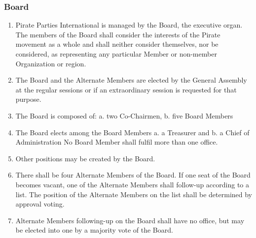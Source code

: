 \begin{frame}

\frametitle{Board}
\label{board}

\begin{enumerate}
\item Pirate Parties International is managed by the Board, the executive organ. The members of the Board shall consider the interests of the Pirate movement as a whole and shall neither consider themselves, nor be considered, as representing any particular Member or non-{}member Organization or region.

\item The Board and the Alternate Members are elected by the General Assembly at the regular sessions or if an extraordinary session is requested for that purpose.

\item The Board is composed of:
 a. two Co-{}Chairmen,
 b. five Board Members

\item The Board elects among the Board Members
 a. a Treasurer and
 b. a Chief of Administration
 No Board Member shall fulfil more than one office.

\item Other positions may be created by the Board.

\item There shall be four Alternate Members of the Board. If one seat of the Board becomes vacant, one of the Alternate Members shall follow-{}up according to a list. The position of the Alternate Members on the list shall be determined by approval voting.

\item Alternate Members following-{}up on the Board shall have no office, but may be elected into one by a majority vote of the Board.

\end{enumerate}

\end{frame}

